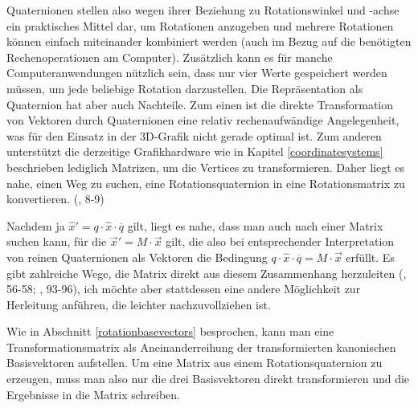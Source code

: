 Quaternionen stellen also wegen ihrer Beziehung zu Rotationswinkel und -achse ein praktisches Mittel dar, um Rotationen anzugeben und mehrere Rotationen können einfach miteinander kombiniert werden (auch im Bezug auf die benötigten Rechenoperationen am Computer). Zusätzlich kann es für manche Computeranwendungen nützlich sein, dass nur vier Werte gespeichert werden müssen, um jede beliebige Rotation darzustellen. Die Repräsentation als Quaternion hat aber auch Nachteile. Zum einen ist die direkte Transformation von Vektoren durch Quaternionen eine relativ rechenaufwändige Angelegenheit, was für den Einsatz in der 3D-Grafik nicht gerade optimal ist. Zum anderen unterstützt die derzeitige Grafikhardware wie in Kapitel \ref{coordinatesystems} beschrieben lediglich Matrizen, um die Vertices zu transformieren. Daher liegt es nahe, einen Weg zu suchen, eine Rotationsquaternion in eine Rotationsmatrix zu konvertieren. (\vgl \citep{rotationissues}, 8-9)

Nachdem ja $\hat{x}'= q \cdot \hat{x} \cdot \overline{q}$ gilt, liegt es nahe, dass man auch nach einer Matrix suchen kann, für die $\vec{x}' = M \cdot \vec{x}$ gilt, die also bei entsprechender Interpretation von reinen Quaternionen als Vektoren die Bedingung $q \cdot \hat{x} \cdot \overline{q} = M \cdot \vec{x}$ erfüllt. Es gibt zahlreiche Wege, die Matrix direkt aus diesem Zusammenhang herzuleiten (\vgl \citep{quaternionrotation}, 56-58; \citep{script:spain}, 93-96), ich möchte aber stattdessen eine andere Möglichkeit zur Herleitung anführen, die leichter nachzuvollziehen ist.

Wie in Abschnitt \ref{rotationbasevectors} besprochen, kann man eine Transformationsmatrix als Aneinanderreihung der transformierten kanonischen Basisvektoren aufstellen. Um eine Matrix aus einem Rotationsquaternion zu erzeugen, muss man also nur die drei Basisvektoren direkt transformieren und die Ergebnisse in die Matrix schreiben.

